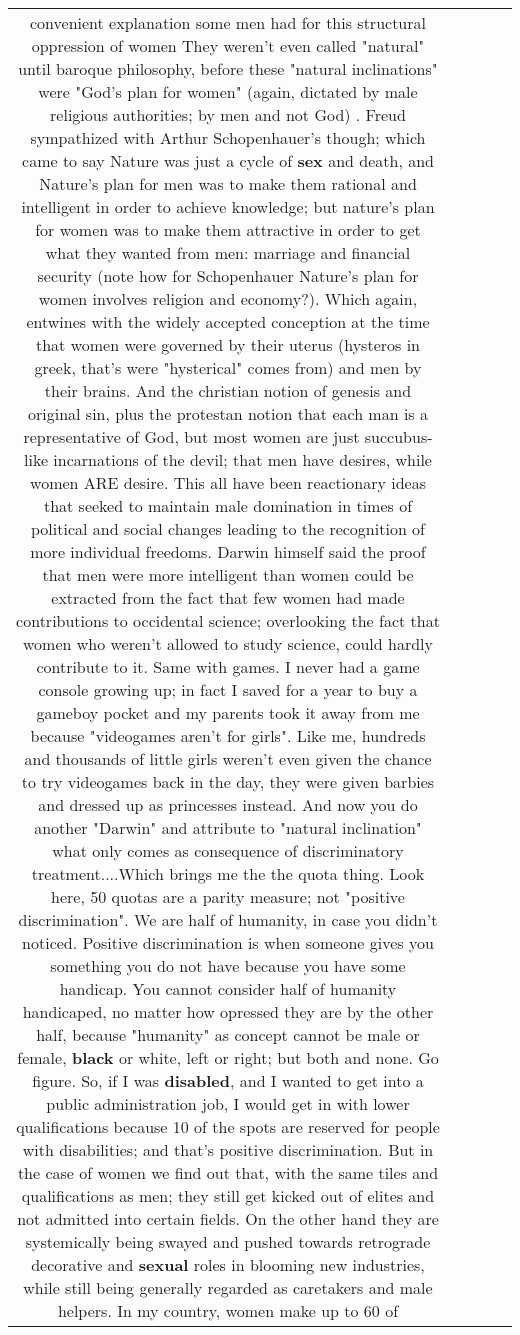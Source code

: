 \documentclass[11pt]{article}
\newlength\mylength
\begin{document}
\begin{center}
\begin{longtable}{|C{.65\mylength}|C{.30\mylength}|C{.12\mylength}|C{.12\mylength}|C{.12\mylength}|}
convenient explanation some men had for this structural oppression of women They weren't even called "natural" until baroque philosophy, before these "natural inclinations" were "God's plan for women" (again, dictated by male religious authorities; by men and not God) . Freud sympathized with Arthur Schopenhauer's though; which came to say Nature was just a cycle of \textbf{sex} and death, and Nature's plan for men was to make them rational and intelligent in order to achieve knowledge; but nature's plan for women was to make them attractive in order to get what they wanted from men: marriage and financial security (note how for Schopenhauer Nature's plan for women involves religion and economy?). Which again, entwines with the widely accepted conception at the time that women were governed by their uterus (hysteros in greek, that's were "hysterical" comes from) and men by their brains. And the christian notion of genesis and original sin, plus the protestan notion that each man is a representative of God, but most women are just succubus-like incarnations of the devil; that men have desires, while women ARE desire. This all have been reactionary ideas that seeked to maintain male domination in times of political and social changes leading to the recognition of more individual freedoms. Darwin himself said the proof that men were more intelligent than women could be extracted from the fact that few women had made contributions to occidental science; overlooking the fact that women who weren't allowed to study science, could hardly contribute to it. Same with games. I never had a game console growing up; in fact I saved for a year to buy a gameboy pocket and my parents took it away from me because "videogames aren't for girls". Like me, hundreds and thousands of little girls weren't even given the chance to try videogames back in the day, they were given barbies and dressed up as princesses instead. And now you do another "Darwin" and attribute to "natural inclination" what only comes as consequence of discriminatory treatment....Which brings me the the quota thing. Look here, 50 quotas are a parity measure; not "positive discrimination". We are half of humanity, in case you didn't noticed. Positive discrimination is when someone gives you something you do not have because you have some handicap. You cannot consider half of humanity handicaped, no matter how opressed they are by the other half, because "humanity" as concept cannot be male or female, \textbf{black} or white, left or right; but both and none. Go figure. So, if I was \textbf{disabled}, and I wanted to get into a public administration job, I would get in with lower qualifications because 10 of the spots are reserved for people with disabilities; and that's positive discrimination. But in the case of women we find out that, with the same tiles and qualifications as men; they still get kicked out of elites and not admitted into certain fields. On the other hand they are systemically being swayed and pushed towards retrograde decorative and \textbf{sexual} roles in blooming new industries, while still being generally regarded as caretakers and male helpers. In my country, women make up to 60 of 
\end{longtable}
\end{center}
\end{document}
